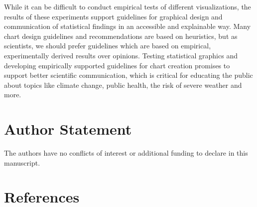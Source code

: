 \documentclass[
  10pt,
]{article}
\begin{document}
While it can be difficult to conduct empirical tests of different
visualizations, the results of these experiments support guidelines for
graphical design and communication of statistical findings in an
accessible and explainable way. Many chart design guidelines and
recommendations are based on heuristics, but as scientists, we should
prefer guidelines which are based on empirical, experimentally derived
results over opinions. Testing statistical graphics and developing
empirically supported guidelines for chart creation promises to support
better scientific communication, which is critical for educating the
public about topics like climate change, public health, the risk of
severe weather and more.

\section{Author Statement}\label{author-statement}

The authors have no conflicts of interest or additional funding to
declare in this manuscript.

\section{References}\label{references}
\end{document}
